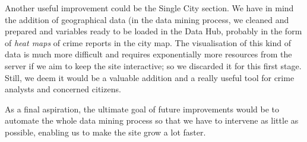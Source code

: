 Another useful improvement could be the Single City section. We have in mind the addition of geographical data (in the data mining process, we cleaned and prepared  and  variables ready to be loaded in the Data Hub, probably in the form of \emph{heat maps} of crime reports in the city map. The visualisation of this kind of data is much more difficult and requires exponentially more resources from the server if we aim to keep the site interactive; so we discarded it for this first stage. Still, we deem it would be a valuable addition and a really useful tool for crime analysts and concerned citizens.

\bigskip
As a final aspiration, the ultimate goal of future improvements would be to automate the whole data mining process so that we have to intervene as little as possible, enabling us to make the site grow a lot faster.
